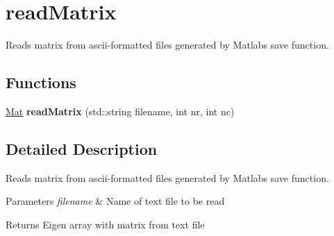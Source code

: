 \hypertarget{group__readMatrix}{}\section{read\+Matrix}
\label{group__readMatrix}


Reads matrix from ascii-\/formatted files generated by Matlab\textquotesingle{}s \textquotesingle{}save\textquotesingle{} function.  


\subsection*{Functions}
\begin{DoxyCompactItemize}
\item 
\mbox{\label{group__readMatrix_gab4929a29168c19ae6815ddf6a062a407}} 
\mbox{\hyperlink{typedefs_8cpp_a9fa28c1f74e909474857584f5c7b0088}{Mat}} {\bfseries read\+Matrix} (std\+::string filename, int nr, int nc)
\end{DoxyCompactItemize}


\subsection{Detailed Description}
Reads matrix from ascii-\/formatted files generated by Matlab\textquotesingle{}s \textquotesingle{}save\textquotesingle{} function. 


\begin{DoxyParams}{Parameters}
{\em filename} & Name of text file to be read \\
\hline
\end{DoxyParams}
\begin{DoxyReturn}{Returns}
Eigen array with matrix from text file 
\end{DoxyReturn}
